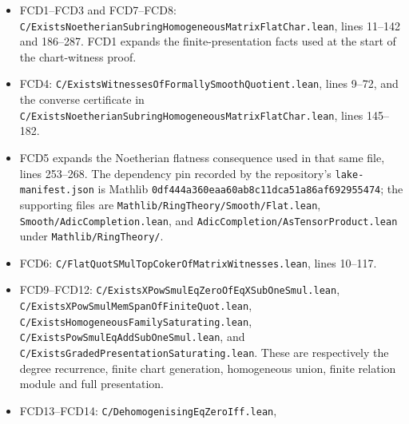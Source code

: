 \begin{itemize}
\item FCD1--FCD3 and FCD7--FCD8:
\texttt{C/\allowbreak{}Exists\allowbreak{}Noetherian\allowbreak{}Subring\allowbreak{}Homogeneous\allowbreak{}Matrix\allowbreak{}Flat\allowbreak{}Char.lean},
lines 11--142 and 186--287.  FCD1 expands the finite-presentation
facts used at the start of the chart-witness proof.
\item FCD4:
\texttt{C/\allowbreak{}Exists\allowbreak{}Witnesses\allowbreak{}Of\allowbreak{}Formally\allowbreak{}Smooth\allowbreak{}Quotient.lean},
lines 9--72, and the converse certificate in
\texttt{C/\allowbreak{}Exists\allowbreak{}Noetherian\allowbreak{}Subring\allowbreak{}Homogeneous\allowbreak{}Matrix\allowbreak{}Flat\allowbreak{}Char.lean},
lines 145--182.
\item FCD5 expands the Noetherian flatness consequence used in that
same file, lines 253--268.  The dependency pin recorded by the
repository's \texttt{lake-manifest.json} is Mathlib
\texttt{0df444a360eaa60ab8c11dca51a86af692955474}; the supporting
files are \texttt{Mathlib/\allowbreak{}Ring\allowbreak{}Theory/\allowbreak{}Smooth/\allowbreak{}Flat.lean},
\texttt{Smooth/\allowbreak{}Adic\allowbreak{}Completion.lean}, and
\texttt{Adic\allowbreak{}Completion/\allowbreak{}As\allowbreak{}Tensor\allowbreak{}Product.lean} under
\texttt{Mathlib/RingTheory/}.
\item FCD6:
\texttt{C/\allowbreak{}Flat\allowbreak{}Quot\allowbreak{}SMul\allowbreak{}Top\allowbreak{}Coker\allowbreak{}Of\allowbreak{}Matrix\allowbreak{}Witnesses.lean}, lines 10--117.
\item FCD9--FCD12:
\texttt{C/\allowbreak{}Exists\allowbreak{}XPow\allowbreak{}Smul\allowbreak{}Eq\allowbreak{}Zero\allowbreak{}Of\allowbreak{}Eq\allowbreak{}XSub\allowbreak{}One\allowbreak{}Smul.lean},
\texttt{C/\allowbreak{}Exists\allowbreak{}XPow\allowbreak{}Smul\allowbreak{}Mem\allowbreak{}Span\allowbreak{}Of\allowbreak{}Finite\allowbreak{}Quot.lean},
\texttt{C/\allowbreak{}Exists\allowbreak{}Homogeneous\allowbreak{}Family\allowbreak{}Saturating.lean},
\texttt{C/\allowbreak{}Exists\allowbreak{}Pow\allowbreak{}Smul\allowbreak{}Eq\allowbreak{}Add\allowbreak{}Sub\allowbreak{}One\allowbreak{}Smul.lean}, and
\texttt{C/\allowbreak{}Exists\allowbreak{}Graded\allowbreak{}Presentation\allowbreak{}Saturating.lean}.
These are respectively the degree recurrence, finite chart generation,
homogeneous union, finite relation module and full presentation.
\item FCD13--FCD14:
\texttt{C/\allowbreak{}Dehomogenising\allowbreak{}Eq\allowbreak{}Zero\allowbreak{}Iff.lean},

\end{itemize}
